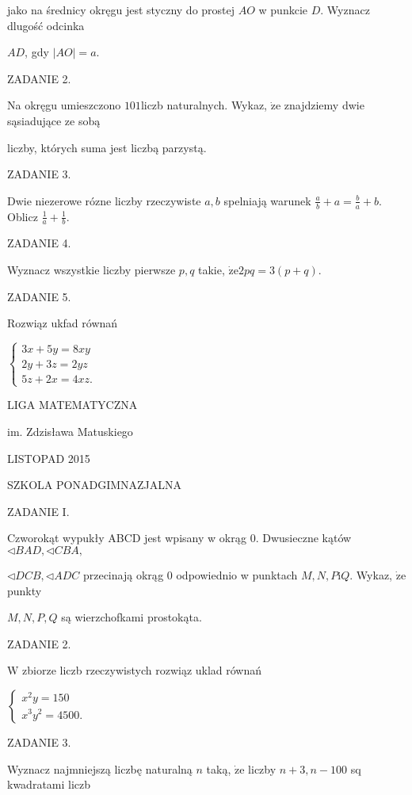 \documentclass[a4paper,12pt]{article}
\begin{document}
jako na średnicy okręgu jest styczny do prostej $AO$ w punkcie $D$. Wyznacz dlugość odcinka

$AD$, gdy $|AO|=a.$

ZADANIE 2.

Na okręgu umieszczono $101$liczb naturalnych. Wykaz, $\dot{\mathrm{z}}\mathrm{e}$ znajdziemy dwie sąsiadujące ze sobą

liczby, których suma jest liczbą parzystą.

ZADANIE 3.

Dwie niezerowe rózne liczby rzeczywiste $a, b$ spelniają warunek $\displaystyle \frac{a}{b}+a=\frac{b}{a}+b$. Oblicz $\displaystyle \frac{1}{a}+\frac{1}{b}.$

ZADANIE 4.

Wyznacz wszystkie liczby pierwsze $p, q$ takie, $\dot{\mathrm{z}}\mathrm{e}2pq=3(p+q).$

ZADANIE 5.

Rozwiąz ukfad równań

$\left\{\begin{array}{l}
3x+5y=8xy\\
2y+3z=2yz\\
5z+2x=4xz.
\end{array}\right.$






LIGA MATEMATYCZNA

im. Zdzisława Matuskiego

LISTOPAD 2015

SZKOLA PONADGIMNAZJALNA

ZADANIE I.

Czworokąt wypukły ABCD jest wpisany w okrąg $0$. Dwusieczne kątów $\triangleleft BAD, \triangleleft CBA,$

$\triangleleft DCB, \triangleleft ADC$ przecinają okrąg $0$ odpowiednio w punktach $M, N, P\mathrm{i}Q$. Wykaz, $\dot{\mathrm{z}}\mathrm{e}$ punkty

$M, N, P, Q$ są wierzchofkami prostokąta.

ZADANIE 2.

$\mathrm{W}$ zbiorze liczb rzeczywistych rozwiąz uklad równań

$\left\{\begin{array}{l}
x^{2}y=150\\
x^{3}y^{2}=4500.
\end{array}\right.$

ZADANIE 3.

Wyznacz najmniejszą liczbę naturalną $n$ taką, $\dot{\mathrm{z}}\mathrm{e}$ liczby $n+3, n-100$ sq kwadratami liczb
\end{document}
